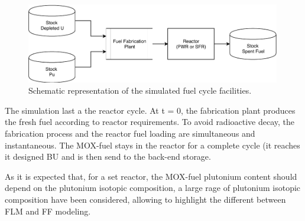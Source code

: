 \begin{figure}[h]
    \begin{center}
        \includegraphics[width = 0.99\textwidth]{FIG/FuelCycleDiagram.pdf}
        \caption{Schematic representation of the simulated fuel cycle facilities.}
        \label{fig:FuelCycle}
    \end{center}
\end{figure}

The simulation last a the reactor cycle. 
%
At t = 0, the fabrication plant produces the fresh fuel according to reactor
requirements. To avoid radioactive decay, the fabrication process and the
reactor fuel loading are simultaneous and instantaneous. The MOX-fuel stays in
the reactor for a complete cycle (it reaches it designed \gls{BU} and is then
send to the back-end storage.


As it is expected that, for a set reactor, the MOX-fuel plutonium content should depend on the
plutonium isotopic composition, a large rage of plutonium isotopic composition
have been considered, allowing to highlight the different between \gls{FLM} and
\gls{FF} modeling.


